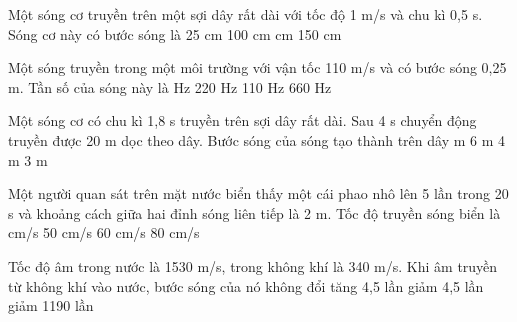 \begin{vidu}%
Một sóng cơ truyền trên một sợi dây rất dài với tốc độ 1 m/s và chu kì 0,5 s. Sóng cơ này có bước sóng là
\choice
{25 cm}
{100 cm}
{ cm}
{150 cm}
\end{vidu} %
\begin{vidu}%
Một sóng truyền trong một môi trường với vận tốc 110  m/s và có bước sóng 0,25 m. Tần số của sóng này là 
\choice
{ Hz}
{220 Hz}
{110 Hz}
{660 Hz}
\end{vidu} %
\begin{vidu}%
Một sóng cơ có chu kì 1,8 s truyền trên sợi dây rất dài. Sau 4 s chuyển động truyền được 20 m dọc theo dây. Bước sóng của sóng tạo thành trên dây
\choice
{ m}
{6 m}
{4 m}
{3 m}
\end{vidu} %
\begin{vidu}%
Một người quan sát trên mặt nước biển thấy một cái phao nhô lên 5 lần trong 20 s và khoảng cách giữa hai đỉnh sóng liên tiếp là 2 m. Tốc độ truyền sóng biển là
\choice
{ cm/s}
{50 cm/s}
{60 cm/s}
{80 cm/s}
\end{vidu} %
\begin{vidu}%
Tốc độ âm trong nước là 1530 m/s, trong không khí là 340 m/s. Khi âm truyền từ không khí vào nước, bước sóng của nó
\choice
{không đổi}
{\True tăng 4,5 lần}
{giảm 4,5 lần}
{giảm 1190 lần}
\end{vidu} %
